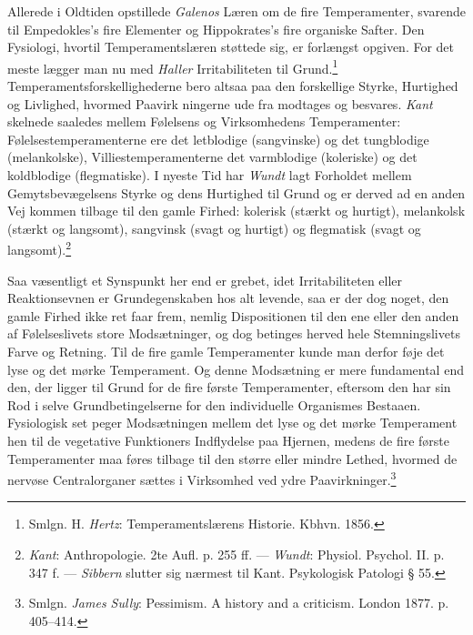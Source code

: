 \documentclass[12pt,a4paper,openany]{book}
\newcommand{\opage}[1]{\marginnote{\footnotesize\textit{[#1]}}}
\begin{document}
Allerede i Oldtiden opstillede \emph{Galenos} Læren om de fire
Temperamenter, svarende til Empedokles’s fire Elementer og Hippokrates’s
fire organiske Safter. Den Fysiologi, hvortil Temperamentslæren støttede
sig, er forlængst opgiven. For det meste lægger man nu med \emph{Haller}
Irritabiliteten til Grund.\footnote[1]{Smlgn. H. \emph{Hertz}:
Temperamentslærens Historie. Kbhvn. 1856.} Temperamentsforskellighederne
bero altsaa paa den forskellige Styrke, Hurtighed og Livlighed, hvormed
Paavirk%
\opage{406}ningerne ude fra modtages og besvares. \emph{Kant} skelnede
saaledes mellem Følelsens og Virksomhedens Temperamenter:
Følelsestemperamenterne ere det letblodige (sangvinske) og det
tungblodige (melankolske), Villiestemperamenterne det varmblodige
(koleriske) og det koldblodige (flegmatiske). I nyeste Tid har
\emph{Wundt} lagt Forholdet mellem Gemytsbevægelsens Styrke og dens
Hurtighed til Grund og er derved ad en anden Vej kommen tilbage til den
gamle Firhed: kolerisk (stærkt og hurtigt), melankolsk (stærkt og
langsomt), sangvinsk (svagt og hurtigt) og flegmatisk (svagt og
langsomt).\footnote[1]{\emph{Kant}: Anthropologie. 2te Aufl. p. 255 ff.
--- \emph{Wundt}: Physiol. Psychol. II. p. 347 f. --- \emph{Sibbern}
slutter sig nærmest til Kant. Psykologisk Patologi § 55.}

Saa væsentligt et Synspunkt her end er grebet, idet Irritabiliteten
eller Reaktionsevnen er Grundegenskaben hos alt levende, saa er der dog
noget, den gamle Firhed ikke ret faar frem, nemlig Dispositionen til den
ene eller den anden af Følelseslivets store Modsætninger, og dog
betinges herved hele Stemningslivets Farve og Retning. Til de fire gamle
Temperamenter kunde man derfor føje det lyse og det mørke Temperament.
Og denne Modsætning er mere fundamental end den, der ligger til Grund
for de fire første Temperamenter, eftersom den har sin Rod i selve
Grundbetingelserne for den individuelle Organismes Bestaaen. Fysiologisk
set peger Modsætningen mellem det lyse og det mørke Temperament hen til
de vegetative Funktioners Indflydelse paa Hjernen, medens de fire første
Temperamenter maa føres tilbage til den større eller mindre Lethed,
hvormed de nervøse Centralorganer sættes i Virksomhed ved ydre
Paavirkninger.\footnote[2]{Smlgn. \emph{James Sully}: Pessimism. A history and
a criticism. London 1877. p. 405--414.}
\end{document}
